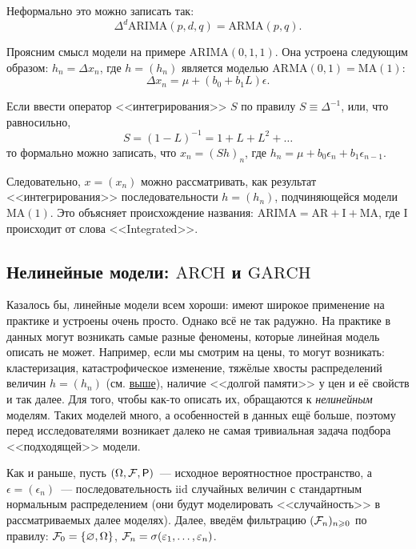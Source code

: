 Неформально это можно записать так:
\[
	\Delta^{d}\mathrm{ARIMA}(p, d, q) = \mathrm{ARMA}(p, q).
\]

Проясним смысл модели на примере \(\mathrm{ARIMA}(0, 1, 1)\). Она устроена 
следующим образом: \(h_{n} = \Delta x_{n}\), где \(h = (h_{n})\) является 
моделью \(\mathrm{ARMA}(0, 1) = \mathrm{MA}(1)\):
\[
	\Delta x_{n} = \mu + (b_{0} + b_{1}L)\epsilon.
\]

Если ввести оператор <<интегрирования>> \(S\) по правилу \(S \equiv 
\Delta^{-1}\), или, что равносильно,
\[
	S = (1 - L)^{-1} = 1 + L + L^{2} + \ldots
\]
то формально можно записать, что \(x_{n} = (Sh)_{n}\), где \(h_{n} = \mu + 
b_{0}\epsilon_{n} + b_{1}\epsilon_{n - 1}\).

Следовательно, \(x = (x_{n})\) можно рассматривать, как результат 
<<интегрирования>> последовательности \(h = (h_{n})\), подчиняющейся модели 
\(\mathrm{MA}(1)\). Это объясняет происхождение названия: \(\mathrm{ARIMA} = 
\mathrm{AR} + \mathrm{I} + \mathrm{MA}\), где I происходит от слова 
<<Integrated>>.

\subsection{Нелинейные модели: \(\mathrm{ARCH}\) и \(\mathrm{GARCH}\)}

Казалось бы, линейные модели всем хороши: имеют широкое применение на практике 
и устроены очень просто. Однако всё не так радужно. На практике в данных могут 
возникать самые разные феномены, которые линейная модель описать не может. 
Например, если мы смотрим на цены, то могут возникать: кластеризация, 
катастрофическое изменение, тяжёлые хвосты распределений величин \(h = 
(h_{n})\) (см. \hyperref[price-time-series]{выше}), наличие <<долгой памяти>> у 
цен и её свойств и так далее. Для того, чтобы как-то описать их, обращаются к 
\emph{нелинейным} моделям. Таких моделей много, а особенностей в данных ещё 
больше, поэтому перед исследователями возникает далеко не самая тривиальная 
задача подбора <<подходящей>> модели.

Как и раньше, пусть \((\Omega, \F, \Pr)\)~--- исходное вероятностное 
пространство, а \(\epsilon = (\epsilon_{n})\)~--- последовательность iid 
случайных величин с стандартным нормальным распределением (они будут 
моделировать <<случайность>> в рассматриваемых далее моделях). Далее, введём 
фильтрацию \((\mathcal{F}_{n})_{n \geqslant 0}\) по правилу: \(\mathcal{F}_{0} = \{\varnothing, 
\Omega\}\), \(\mathcal{F}_{n} = \sigma(\varepsilon_{1}, \ldots, \varepsilon_{n})\).


